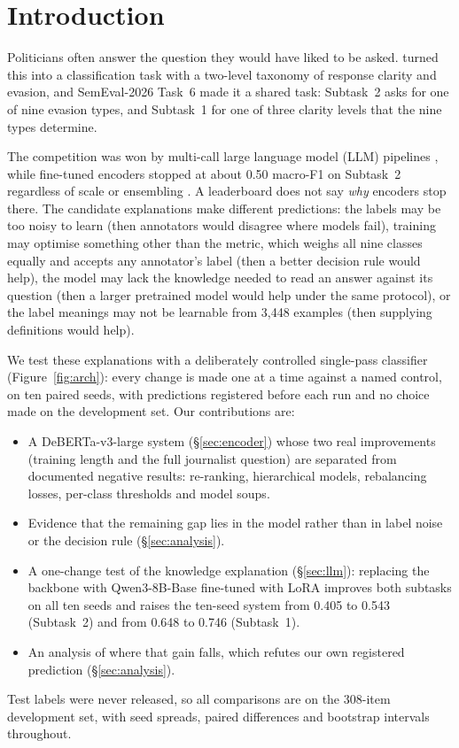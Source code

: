 \section{Introduction}
\label{sec:intro}
\FigureArch

Politicians often answer the question they would have liked to be asked.
\citet{thomas-etal-2024-never} turned this into a classification task with a two-level taxonomy of response clarity and evasion, and SemEval-2026 Task~6 \citep{thomas-etal-2026-semeval} made it a shared task: Subtask~2 asks for one of nine evasion types, and Subtask~1 for one of three clarity levels that the nine types determine.

The competition was won by multi-call large language model (LLM) pipelines \citep{shi-etal-2026-teleai,peerachaidecho-rutherford-2026-chulanlp}, while fine-tuned encoders stopped at about 0.50 macro-F1 on Subtask~2 regardless of scale or ensembling \citep{thomas-etal-2026-semeval}.
A leaderboard does not say \emph{why} encoders stop there.
The candidate explanations make different predictions: the labels may be too noisy to learn (then annotators would disagree where models fail), training may optimise something other than the metric, which weighs all nine classes equally and accepts any annotator's label (then a better decision rule would help), the model may lack the knowledge needed to read an answer against its question (then a larger pretrained model would help under the same protocol), or the label meanings may not be learnable from 3,448 examples (then supplying definitions would help).

We test these explanations with a deliberately controlled single-pass classifier (Figure~\ref{fig:arch}): every change is made one at a time against a named control, on ten paired seeds, with predictions registered before each run and no choice made on the development set.
Our contributions are:
\begin{itemize}
  \item A DeBERTa-v3-large system (\S\ref{sec:encoder}) whose two real improvements (training length and the full journalist question) are separated from documented negative results: re-ranking, hierarchical models, rebalancing losses, per-class thresholds and model soups.
  \item Evidence that the remaining gap lies in the model rather than in label noise or the decision rule (\S\ref{sec:analysis}).
  \item A one-change test of the knowledge explanation (\S\ref{sec:llm}): replacing the backbone with Qwen3-8B-Base fine-tuned with LoRA \citep{qwen3,hu2022lora} improves both subtasks on all ten seeds and raises the ten-seed system from 0.405 to 0.543 (Subtask~2) and from 0.648 to 0.746 (Subtask~1).
  \item An analysis of where that gain falls, which refutes our own registered prediction (\S\ref{sec:analysis}).
\end{itemize}
Test labels were never released, so all comparisons are on the 308-item development set, with seed spreads, paired differences and bootstrap intervals throughout.
